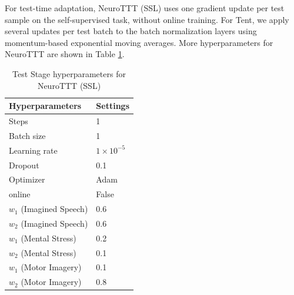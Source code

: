 For test-time adaptation, NeuroTTT (SSL) uses one gradient update per test sample on the self-supervised task, without online training. For Tent, we apply several updates per test batch to the batch normalization layers using momentum-based exponential moving averages. More hyperparameters for NeuroTTT are shown in Table \ref{tab:neurottt-hparams}.

\begin{table}[t]
\centering
\caption{Test Stage hyperparameters for NeuroTTT (SSL)}
\label{tab:neurottt-hparams}
\begin{tabular}{l l}
\toprule
\textbf{Hyperparameters} & \textbf{Settings} \\
\midrule
Steps & 1 \\
Batch size & 1 \\
Learning rate & $1\times10^{-5}$ \\
Dropout & 0.1 \\
Optimizer & Adam \\
online & False \\
\midrule
$w_1$ (Imagined Speech) & 0.6 \\
$w_2$ (Imagined Speech) & 0.6 \\
$w_1$ (Mental Stress) & 0.2 \\
$w_2$ (Mental Stress) & 0.1 \\
$w_1$ (Motor Imagery) & 0.1 \\
$w_2$ (Motor Imagery) & 0.8 \\
\bottomrule
\end{tabular}
\end{table}







